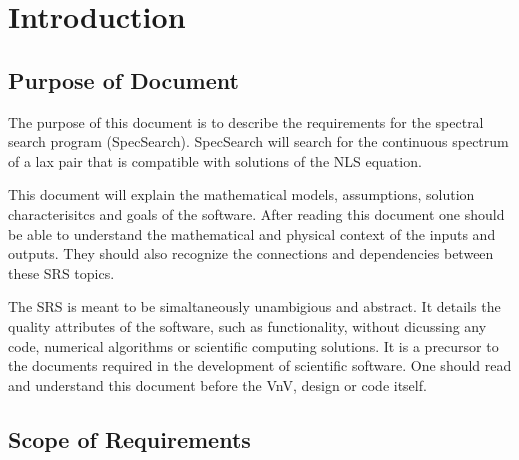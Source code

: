\documentclass[12pt]{article}
\begin{document}
\newpage
\tableofcontents



\newpage

\section{Introduction}


\subsection{Purpose of Document}

The purpose of this document is to describe the requirements for the spectral 
search program (SpecSearch). SpecSearch  will search for the 
continuous spectrum of a lax pair  that is compatible with solutions 
of the NLS 
equation.

This document will explain the mathematical models, assumptions, 
solution characterisitcs and goals of the software. After reading this document 
one should be able to understand the mathematical and physical context of the 
inputs and outputs. They should also recognize the connections and 
dependencies between these SRS topics.

The SRS is meant to be simaltaneously unambigious and abstract. It details the 
quality attributes of the software, such as functionality, 
without dicussing any code, numerical algorithms or scientific computing 
solutions. It is a precursor to the documents required in the development of 
scientific software. One should read and understand this document before the 
VnV, design or code itself. 

\subsection{Scope of Requirements} 
\end{document}
